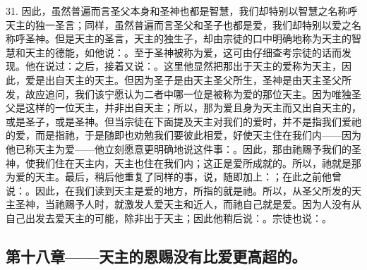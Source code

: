 31. 因此，虽然普遍而言圣父本身和圣神也都是智慧，我们却特别以智慧之名称呼天主的独一圣言；同样，虽然普遍而言圣父和圣子也都是爱，我们却特别以爱之名称呼圣神。但是天主的圣言，天主的独生子，却由宗徒的口中明确地称为天主的智慧和天主的德能，如他说：。至于圣神被称为爱，这可由仔细查考宗徒的话而发现。他在说过：之后，接着又说：。这里他显然把那出于天主的爱称为天主，因此，爱是出自天主的天主。但因为圣子是由天主圣父所生，圣神是由天主圣父所发，故应追问，我们该宁愿认为二者中哪一位是被称为爱的那位天主。因为唯独圣父是这样的一位天主，并非出自天主；所以，那为爱且身为天主而又出自天主的，或是圣子，或是圣神。但当宗徒在下面提及天主对我们的爱时，并不是指我们爱祂的爱，而是指祂，于是随即也劝勉我们要彼此相爱，好使天主住在我们内——因为他已称天主为爱——他立刻愿意更明确地说这件事：。因此，那由祂赐予我们的圣神，使我们住在天主内，天主也住在我们内；这正是爱所成就的。所以，祂就是那为爱的天主。最后，稍后他重复了同样的事，说，随即加上：；在此之前他曾说：。因此，在我们读到天主是爱的地方，所指的就是祂。所以，从圣父所发的天主圣神，当祂赐予人时，就激发人爱天主和近人，而祂自己就是爱。因为人没有从自己出发去爱天主的可能，除非出于天主；因此他稍后说：。宗徒也说：。\par


\subsection{第十八章——天主的恩赐没有比爱更高超的。}

